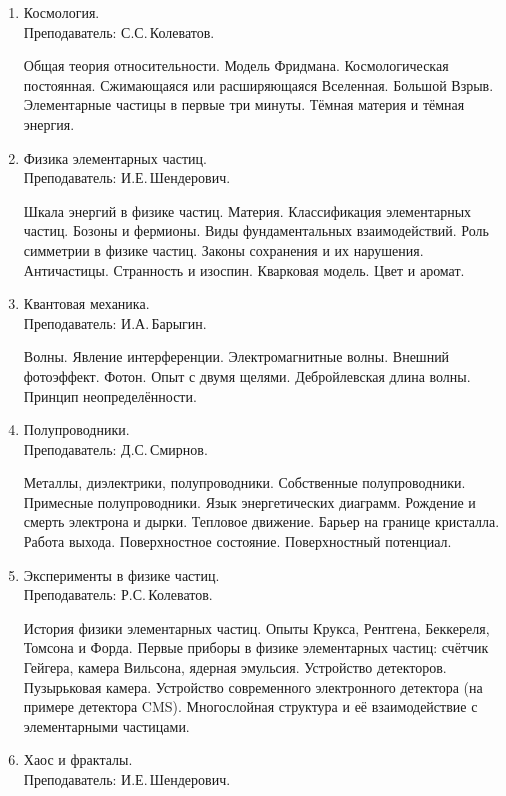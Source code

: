 \documentclass[12pt,a4paper,oneside]{scrartcl}
\newlength{\h}
\newlength{\x}
\begin{document}
\begin{enumerate}
\item Космология. \\ \textsf{Преподаватель: С.С.\,Колеватов.}

  Общая теория относительности. Модель Фридмана. Космологическая
  постоянная. Сжимающаяся или расширяющаяся Вселенная. Большой
  Взрыв. Элементарные частицы в первые три минуты. Тёмная материя и
  тёмная энергия.

\item Физика элементарных частиц. \\ \textsf{Преподаватель: И.Е.\,Шендерович}.

  Шкала энергий в физике частиц. Материя. Классификация элементарных
  частиц. Бозоны и фермионы. Виды фундаментальных взаимодействий. Роль
  симметрии в физике частиц. Законы сохранения и их
  нарушения. Античастицы. Странность и изоспин. Кварковая модель. Цвет
  и аромат.

\item Квантовая механика. \\ \textsf{Преподаватель: И.А.\,Барыгин}.

  Волны. Явление интерференции. Электромагнитные волны. Внешний
  фотоэффект. Фотон. Опыт с двумя щелями. Дебройлевская длина
  волны. Принцип неопределённости.

\item Полупроводники.  \\ \textsf{Преподаватель: Д.С.\,Смирнов}.

  Металлы, диэлектрики, полупроводники. Собственные
  полупроводники. Примесные полупроводники. Язык энергетических
  диаграмм. Рождение и смерть электрона и дырки. Тепловое
  движение. Барьер на границе кристалла. Работа выхода. Поверхностное
  состояние. Поверхностный потенциал.

\item Эксперименты в физике частиц.  \\ \textsf{Преподаватель:
    Р.С.\,Колеватов}.

  История физики элементарных частиц. Опыты Крукса, Рентгена,
  Беккереля, Томсона и Форда. Первые приборы в физике элементарных
  частиц: счётчик Гейгера, камера Вильсона, ядерная
  эмульсия. Устройство детекторов. Пузырьковая камера. Устройство
  современного электронного детектора (на примере детектора
  CMS). Многослойная структура и её взаимодействие с элементарными
  частицами. 

\item Хаос и фракталы.\\ \textsf{Преподаватель: И.Е.\,Шендерович}.


\end{enumerate}
\end{document}

